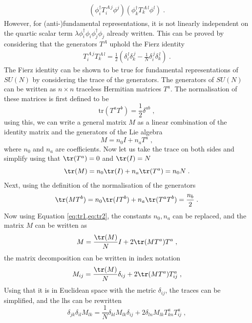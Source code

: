 \begin{align}
    (\phi_i^\dagger T_i ^{\,A\,j}\phi^j)(\phi_k^\dagger T_k ^{\,A\,l}\phi^l)\;.
\end{align}
However, for (anti-)fundamental representations, it is not linearly independent on the quartic scalar term $\lambda \phi^\dagger_i \phi_i \phi^\dagger_j \phi_j $  already written. This can be proved by considering that the generators $T^A$ uphold the Fierz identity
\begin{align}
    T_i ^{\,A\,j}T_k ^{\,A\,l}=\frac{1}{2}\left(\delta_i^{\,l}\delta_k^{\,j}-\frac{1}{N}\delta_i^{\,j}\delta_k^{\,l}\right) \;.
\end{align}
The Fierz identity can be shown to be true for fundamental representations of $SU(N)$ by considering the trace of the generators. The generators of $SU(N)$ can be written as $n\times n $ traceless Hermitian matrices $T^a$. The normalisation of these matrices is first defined to be 
\begin{equation}
      \text{tr}(T^a T^b)=\frac{1}{2}\delta^{ab}\;,
\end{equation}
using this, we can write a general matrix $M$ as a linear combination of the identity matrix and the generators of the Lie algebra
\begin{equation}
      M=n_0 I+n_aT^a\;,
\end{equation}
where $n_0$ and $n_a$ are coefficients. Now let us take the trace on both sides and simplify using that $\tr(T^a)=0$ and $\tr(I)=N$
\begin{equation}
      \tr(M)=n_0 \tr(I)+n_a\tr(T^a)=n_0N\;.\label{eq:tr1}
\end{equation}
Next, using the definition of the normalisation of the generators
\begin{equation}
      \tr(MT^b)=n_0 \tr(IT^b)+n_a\tr(T^aT^b)=\frac{n_b}{2}\;.\label{eq:tr2}
\end{equation}
Now using Equation \ref{eq:tr1,eq:tr2}, the constants $n_0,n_a$ can be replaced, and the matrix $M$ can be written as
\begin{equation}
      M=\frac{\tr(M)}{N} I+2\tr(MT^a)T^a\;,
\end{equation}
the matrix decomposition can be written in index notation
\begin{equation}
      M_{ij}=\frac{\tr(M)}{N} \delta_{ij}+2\tr(MT^a)T^a_{ij}\;,
\end{equation}
Using that it is in Euclidean space with the metric $\delta_{ij}$, the traces can be simplified, and the lhs can be rewritten
\begin{equation}
      \delta_{jk}\delta_{il}M_{lk}=\frac{1}{N} \delta_{kl}M_{lk}\delta_{ij}+2\delta_{ln}M_{lk}T^a_{kn}T^a_{ij}\;,
\end{equation}

